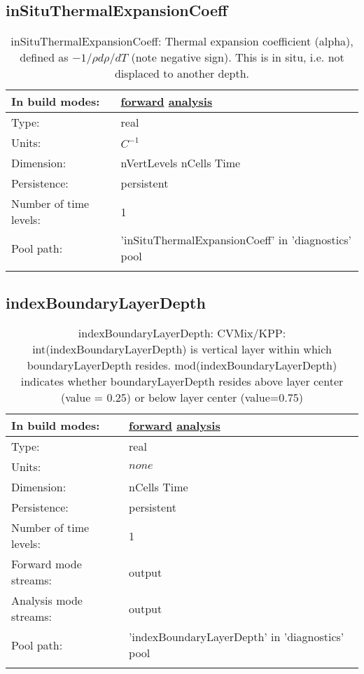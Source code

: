 \subsection[inSituThermalExpansionCoeff]{inSituThermalExpansionCoeff}
\label{subsec:var_sec_diagnostics_inSituThermalExpansionCoeff}
\begin{center}
\begin{longtable}{| p{2.0in} | p{4.0in} |}
        \hline 
        In build modes: & \hyperref[subsec:forward_var_tab_diagnostics]{forward} \hyperref[subsec:analysis_var_tab_diagnostics]{analysis} \\
        \hline 
        Type: & real \\
        \hline 
        Units: & $C^{-1}$ \\
        \hline 
        Dimension: & nVertLevels nCells Time \\
        \hline 
        Persistence: & persistent \\
        \hline 
        Number of time levels: & 1 \\
        \hline 
            Pool path: & 'inSituThermalExpansionCoeff' in 'diagnostics' pool
 \\
		 \hline 
    \caption{inSituThermalExpansionCoeff:  Thermal expansion coefficient (alpha), defined as  $-1/\rho d\rho/dT$  (note negative sign).  This is in situ, i.e. not displaced to another depth.}
\end{longtable}
\end{center}
\subsection[indexBoundaryLayerDepth]{indexBoundaryLayerDepth}
\label{subsec:var_sec_diagnostics_indexBoundaryLayerDepth}
\begin{center}
\begin{longtable}{| p{2.0in} | p{4.0in} |}
        \hline 
        In build modes: & \hyperref[subsec:forward_var_tab_diagnostics]{forward} \hyperref[subsec:analysis_var_tab_diagnostics]{analysis} \\
        \hline 
        Type: & real \\
        \hline 
        Units: & $none$ \\
        \hline 
        Dimension: & nCells Time \\
        \hline 
        Persistence: & persistent \\
        \hline 
        Number of time levels: & 1 \\
        \hline 
		 Forward mode streams: &  output \\
        \hline 
		 Analysis mode streams: &  output \\
        \hline 
            Pool path: & 'indexBoundaryLayerDepth' in 'diagnostics' pool
 \\
		 \hline 
    \caption{indexBoundaryLayerDepth: CVMix/KPP: int(indexBoundaryLayerDepth) is vertical layer within which boundaryLayerDepth resides. mod(indexBoundaryLayerDepth) indicates whether boundaryLayerDepth resides above layer center (value = 0.25) or below layer center (value=0.75)}
\end{longtable}
\end{center}
